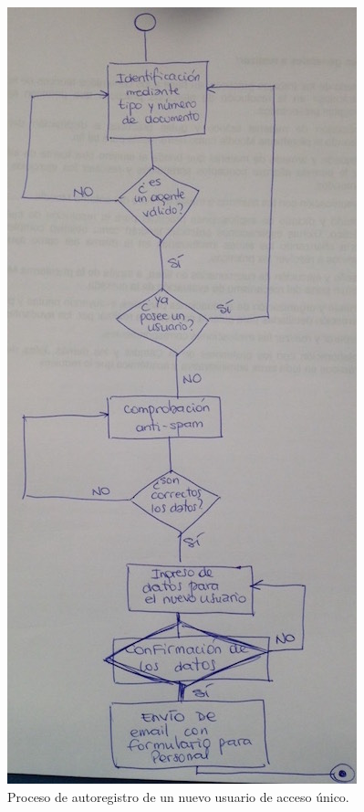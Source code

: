 \begin{figure}[H]
  \centering
  \includegraphics[width=\textwidth,height=0.5\textheight,keepaspectratio]{src/images/04-capitulo-4/diagrama-flujo-registro.jpg}
  \caption{Proceso de autoregistro de un nuevo usuario de acceso único.}
  \label{fig:diagrama-flujo-registro}
\end{figure}

